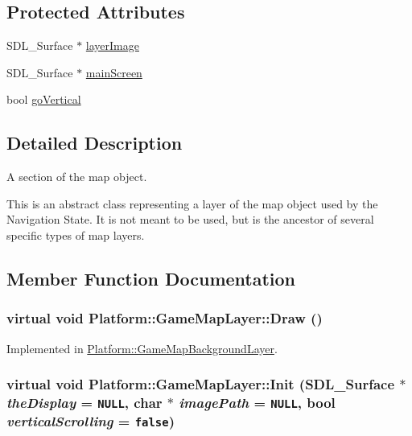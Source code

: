 \subsection*{Protected Attributes}
\begin{CompactItemize}
\item 
SDL\_\-Surface $\ast$ \hyperlink{class_platform_1_1_game_map_layer_b94756f95136f23ec04b70ecb6351e2e}{layerImage}
\item 
SDL\_\-Surface $\ast$ \hyperlink{class_platform_1_1_game_map_layer_8a269526befbbbcc5b0d201f659c90fe}{mainScreen}
\item 
bool \hyperlink{class_platform_1_1_game_map_layer_e4f38bbcc758a8099c296f130912f8f6}{goVertical}
\end{CompactItemize}


\subsection{Detailed Description}
A section of the map object. 

This is an abstract class representing a layer of the map object used by the Navigation State. It is not meant to be used, but is the ancestor of several specific types of map layers. 

\subsection{Member Function Documentation}
\hypertarget{class_platform_1_1_game_map_layer_cc44f193d8cf01e97fe34cb7da72e640}{
\subsubsection[{Draw}]{\setlength{\rightskip}{0pt plus 5cm}virtual void Platform::GameMapLayer::Draw ()}}
\label{d8/d53/class_platform_1_1_game_map_layer_cc44f193d8cf01e97fe34cb7da72e640}




Implemented in \hyperlink{class_platform_1_1_game_map_background_layer_f6910e7841ae5315baa5fd956202a982}{Platform::GameMapBackgroundLayer}.\hypertarget{class_platform_1_1_game_map_layer_a25bd5a4d69574dfb3cefdd544e36e8d}{
\subsubsection[{Init}]{\setlength{\rightskip}{0pt plus 5cm}virtual void Platform::GameMapLayer::Init (SDL\_\-Surface $\ast$ {\em theDisplay} = {\tt NULL}, \/  char $\ast$ {\em imagePath} = {\tt NULL}, \/  bool {\em verticalScrolling} = {\tt false})}}
\label{d8/d53/class_platform_1_1_game_map_layer_a25bd5a4d69574dfb3cefdd544e36e8d}




